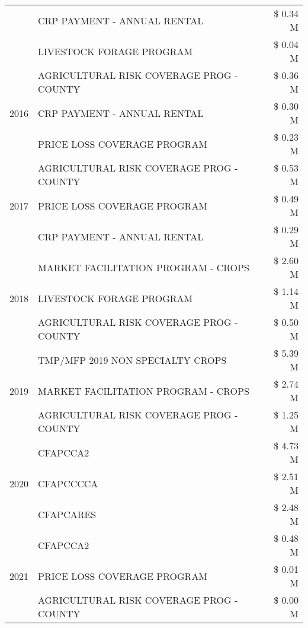 \begin{tabular}{llr}
 & CRP PAYMENT - ANNUAL RENTAL & \$ 0.34 M \\
 & LIVESTOCK FORAGE PROGRAM & \$ 0.04 M \\
\cline{1-3}
\multirow[t]{3}{*}{2016} & AGRICULTURAL RISK COVERAGE PROG - COUNTY & \$ 0.36 M \\
 & CRP PAYMENT - ANNUAL RENTAL & \$ 0.30 M \\
 & PRICE LOSS COVERAGE PROGRAM & \$ 0.23 M \\
\cline{1-3}
\multirow[t]{3}{*}{2017} & AGRICULTURAL RISK COVERAGE PROG - COUNTY & \$ 0.53 M \\
 & PRICE LOSS COVERAGE PROGRAM & \$ 0.49 M \\
 & CRP PAYMENT - ANNUAL RENTAL & \$ 0.29 M \\
\cline{1-3}
\multirow[t]{3}{*}{2018} & MARKET FACILITATION PROGRAM - CROPS & \$ 2.60 M \\
 & LIVESTOCK FORAGE PROGRAM & \$ 1.14 M \\
 & AGRICULTURAL RISK COVERAGE PROG - COUNTY & \$ 0.50 M \\
\cline{1-3}
\multirow[t]{3}{*}{2019} & TMP/MFP 2019 NON SPECIALTY CROPS & \$ 5.39 M \\
 & MARKET FACILITATION PROGRAM - CROPS & \$ 2.74 M \\
 & AGRICULTURAL RISK COVERAGE PROG - COUNTY & \$ 1.25 M \\
\cline{1-3}
\multirow[t]{3}{*}{2020} & CFAPCCA2 & \$ 4.73 M \\
 & CFAPCCCCA & \$ 2.51 M \\
 & CFAPCARES & \$ 2.48 M \\
\cline{1-3}
\multirow[t]{3}{*}{2021} & CFAPCCA2 & \$ 0.48 M \\
 & PRICE LOSS COVERAGE PROGRAM & \$ 0.01 M \\
 & AGRICULTURAL RISK COVERAGE PROG - COUNTY & \$ 0.00 M \\
\cline{1-3}
\bottomrule
\end{tabular}
